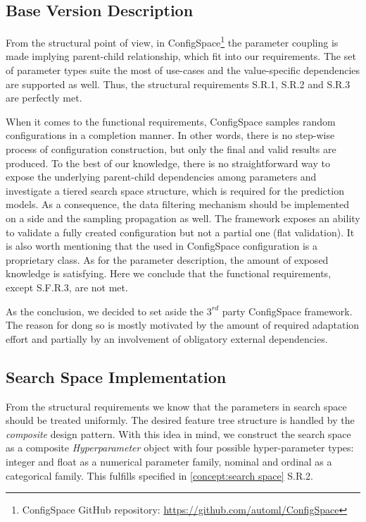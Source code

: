 \subsection{Base Version Description}
From the structural point of view, in ConfigSpace\footnote{ConfigSpace GitHub repository: \url{https://github.com/automl/ConfigSpace}} the parameter coupling is made implying parent-child relationship, which fit into our requirements. The set of parameter types suite the most of use-cases and the value-specific dependencies are supported as well. Thus, the structural requirements S.R.1, S.R.2 and S.R.3 are perfectly met.

When it comes to the functional requirements, ConfigSpace samples random configurations in a completion manner. In other words, there is no step-wise process of configuration construction, but only the final and valid results are produced. To the best of our knowledge, there is no straightforward way to expose the underlying parent-child dependencies among parameters and investigate a tiered search space structure, which is required for the prediction models. As a consequence, the data filtering mechanism should be implemented on a side and the sampling propagation as well. The framework exposes an ability to validate a fully created configuration but not a partial one (flat validation). It is also worth mentioning that the used in ConfigSpace configuration is a proprietary class. As for the parameter description, the amount of exposed knowledge is satisfying. Here we conclude that the functional requirements, except S.F.R.3, are not met.

As the conclusion, we decided to set aside the $3^{rd}$ party ConfigSpace framework. The reason for dong so is mostly motivated by the amount of required adaptation effort and partially by an involvement of obligatory external dependencies.


\subsection{Search Space Implementation}\label{impl: search space impl}
From the structural requirements we know that the parameters in search space should be treated uniformly. The desired feature tree structure is handled by the \emph{composite} design pattern. With this idea in mind, we construct the search space as a composite \emph{Hyperparameter} object with four possible hyper-parameter types: integer and float as a numerical parameter family, nominal and ordinal as a categorical family. This fulfills specified in \cref{concept:search space} S.R.2.

